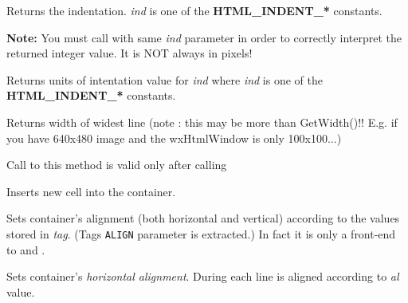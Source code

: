 Returns the indentation. {\it ind} is one of the {\bf HTML\_INDENT\_*} constants.

{\bf Note:} You must call 
with same {\it ind} parameter in order to correctly interpret the returned integer value.
It is NOT always in pixels!

\label{wxhtmlcontainercellgetindentunits}


Returns units of intentation value for {\it ind} where {\it ind} is one
of the {\bf HTML\_INDENT\_*} constants.


\label{wxhtmlcontainercellgetmaxlinewidth}


Returns width of widest line (note : this may be more than GetWidth()!!
E.g. if you have 640x480 image and the wxHtmlWindow is only 100x100...)

Call to this method is valid only after calling 

\label{wxhtmlcontainercellinsertcell}


Inserts new cell into the container.

\label{wxhtmlcontainercellsetalign}


Sets container's alignment (both horizontal and vertical) according to
the values stored in {\it tag}. (Tags {\tt ALIGN} parameter is extracted.) In fact
it is only a front-end to 
and .


\label{wxhtmlcontainercellsetalignhor}


Sets container's {\it horizontal alignment}. During 
each line is aligned according to {\it al} value.




